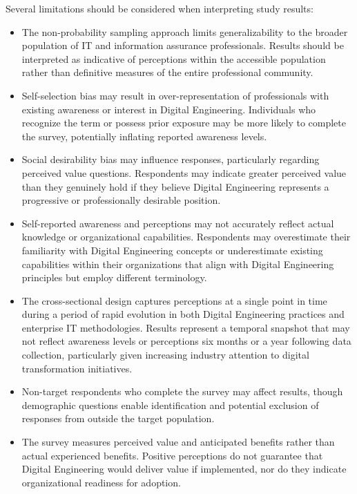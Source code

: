 Several limitations should be considered when interpreting study results:

\begin{itemize}
  \item The non-probability sampling approach limits generalizability to the broader population of IT and information assurance professionals. Results should be interpreted as indicative of perceptions within the accessible population rather than definitive measures of the entire professional community.

  \item Self-selection bias may result in over-representation of professionals with existing awareness or interest in Digital Engineering. Individuals who recognize the term or possess prior exposure may be more likely to complete the survey, potentially inflating reported awareness levels.

  \item Social desirability bias may influence responses, particularly regarding perceived value questions. Respondents may indicate greater perceived value than they genuinely hold if they believe Digital Engineering represents a progressive or professionally desirable position.

  \item Self-reported awareness and perceptions may not accurately reflect actual knowledge or organizational capabilities. Respondents may overestimate their familiarity with Digital Engineering concepts or underestimate existing capabilities within their organizations that align with Digital Engineering principles but employ different terminology.

  \item The cross-sectional design captures perceptions at a single point in time during a period of rapid evolution in both Digital Engineering practices and enterprise IT methodologies. Results represent a temporal snapshot that may not reflect awareness levels or perceptions six months or a year following data collection, particularly given increasing industry attention to digital transformation initiatives.

  \item Non-target respondents who complete the survey may affect results, though demographic questions enable identification and potential exclusion of responses from outside the target population.

  \item The survey measures perceived value and anticipated benefits rather than actual experienced benefits. Positive perceptions do not guarantee that Digital Engineering would deliver value if implemented, nor do they indicate organizational readiness for adoption.
\end{itemize}

